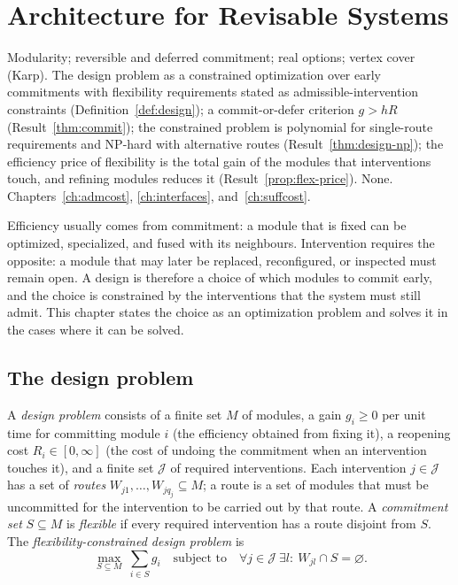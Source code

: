 \chapter{Architecture for Revisable Systems}\label{ch:architecture}
{Modularity; reversible and deferred commitment; real options; vertex cover (Karp).}
{The design problem as a constrained optimization over early commitments with flexibility requirements stated as admissible-intervention constraints (Definition~\ref{def:design}); a commit-or-defer criterion $g>hR$ (Result~\ref{thm:commit}); the constrained problem is polynomial for single-route requirements and NP-hard with alternative routes (Result~\ref{thm:design-np}); the efficiency price of flexibility is the total gain of the modules that interventions touch, and refining modules reduces it (Result~\ref{prop:flex-price}).}
{None.}
{Chapters~\ref{ch:admcost}, \ref{ch:interfaces}, and~\ref{ch:suffcost}.}

Efficiency usually comes from commitment: a module that is fixed can be optimized, specialized, and fused with its neighbours. Intervention requires the opposite: a module that may later be replaced, reconfigured, or inspected must remain open. A design is therefore a choice of which modules to commit early, and the choice is constrained by the interventions that the system must still admit. This chapter states the choice as an optimization problem and solves it in the cases where it can be solved.

\section{The design problem}

\begin{definition}\label{def:design}
A \emph{design problem} consists of a finite set $M$ of modules, a gain $g_i\ge0$ per unit time for committing module $i$ (the efficiency obtained from fixing it), a reopening cost $R_i\in[0,\infty]$ (the cost of undoing the commitment when an intervention touches it), and a finite set $\mathcal J$ of required interventions. Each intervention $j\in\mathcal J$ has a set of \emph{routes} $W_{j1},\dots,W_{jq_j}\subseteq M$; a route is a set of modules that must be uncommitted for the intervention to be carried out by that route. A \emph{commitment set} $S\subseteq M$ is \emph{flexible} if every required intervention has a route disjoint from $S$. The \emph{flexibility-constrained design problem} is
\[
\max_{S\subseteq M}\ \sum_{i\in S}g_i\quad\text{subject to}\quad\forall j\in\mathcal J\ \exists l:\ W_{jl}\cap S=\varnothing .
\]
\end{definition}

